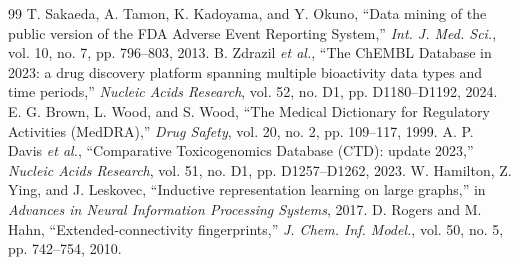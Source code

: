 \documentclass[conference,letterpaper]{IEEEtran}
\begin{document}
\begin{thebibliography}{99}
 T. Sakaeda, A. Tamon, K. Kadoyama, and Y. Okuno, ``Data mining of the public version of the FDA Adverse Event Reporting System,'' \emph{Int. J. Med. Sci.}, vol. 10, no. 7, pp. 796--803, 2013.
 B. Zdrazil \emph{et al.}, ``The ChEMBL Database in 2023: a drug discovery platform spanning multiple bioactivity data types and time periods,'' \emph{Nucleic Acids Research}, vol. 52, no. D1, pp. D1180--D1192, 2024.
 E. G. Brown, L. Wood, and S. Wood, ``The Medical Dictionary for Regulatory Activities (MedDRA),'' \emph{Drug Safety}, vol. 20, no. 2, pp. 109--117, 1999.
 A. P. Davis \emph{et al.}, ``Comparative Toxicogenomics Database (CTD): update 2023,'' \emph{Nucleic Acids Research}, vol. 51, no. D1, pp. D1257--D1262, 2023.
 W. Hamilton, Z. Ying, and J. Leskovec, ``Inductive representation learning on large graphs,'' in \emph{Advances in Neural Information Processing Systems}, 2017.
 D. Rogers and M. Hahn, ``Extended-connectivity fingerprints,'' \emph{J. Chem. Inf. Model.}, vol. 50, no. 5, pp. 742--754, 2010.
\end{thebibliography}
\end{document}
